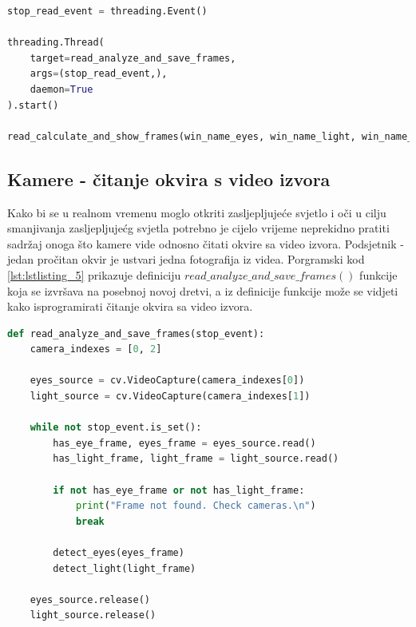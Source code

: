 \documentclass{foi}
\begin{document}
\begin{lstlisting}[language=Python, label={lst:lstlisting_4}, firstnumber=151, style=colored, caption={Inicijaliziranje dretvenog događaja $stop\_read\_event$, stvaranje i pokretanje nove dretve i pozivanje funkcije $read\_analyze\_and\_save\_frames()$ u glavnoj dretvi}]
stop_read_event = threading.Event()

threading.Thread(
    target=read_analyze_and_save_frames,
    args=(stop_read_event,),
    daemon=True
).start()

read_calculate_and_show_frames(win_name_eyes, win_name_light, win_name_protection)
\end{lstlisting}

\subsection{Kamere - čitanje okvira s video izvora}

Kako bi se u realnom vremenu moglo otkriti zasljepljujeće svjetlo i oči u cilju smanjivanja zasljepljujećg svjetla potrebno je cijelo vrijeme neprekidno pratiti sadržaj onoga što kamere vide odnosno čitati okvire sa video izvora. Podsjetnik - jedan pročitan okvir je ustvari jedna fotografija iz videa. Porgramski kod \ref{lst:lstlisting_5} prikazuje definiciju $read\_analyze\_and\_save\_frames()$ funkcije koja se izvršava na posebnoj novoj dretvi, a iz definicije funkcije može se vidjeti kako isprogramirati čitanje okvira sa video izvora.

\begin{lstlisting}[language=Python, label={lst:lstlisting_5}, firstnumber=13, style=colored, caption={Definicija funkcije $read\_analyze\_and\_save\_frames()$}]
def read_analyze_and_save_frames(stop_event):
    camera_indexes = [0, 2]

    eyes_source = cv.VideoCapture(camera_indexes[0])
    light_source = cv.VideoCapture(camera_indexes[1])

    while not stop_event.is_set():
        has_eye_frame, eyes_frame = eyes_source.read()
        has_light_frame, light_frame = light_source.read()

        if not has_eye_frame or not has_light_frame:
            print("Frame not found. Check cameras.\n")
            break

        detect_eyes(eyes_frame)
        detect_light(light_frame)

    eyes_source.release()
    light_source.release()
\end{lstlisting}
\end{document}
